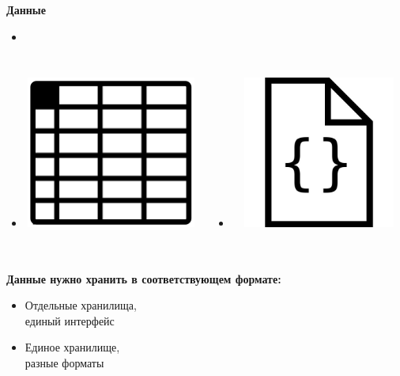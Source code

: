 \documentclass[18pt, compress, aspectratio=169]{beamer}
\begin{document}
\begin{frame}[fragile]
    \frametitle{}
    \begin{center}
        \textbf{Данные}
    \end{center}
    \begin{itemize}[leftmargin=*]
        \item <+->
    \end{itemize}

    \vspace{-40pt}

    \begin{columns}[T,onlytextwidth]
    \begin{itemize}[leftmargin=*]
        \item <+->\includegraphics[width=6cm,height=5cm]{relation.png}
    \end{itemize}

    \vspace{20pt}

    \begin{itemize}[leftmargin=*]
        \item <+->\includegraphics[width=6cm,height=5cm]{document.jpg}
    \end{itemize}
    \end{columns}
\end{frame}

\begin{frame}
    \frametitle{}
    \begin{center}
        \textbf{Данные нужно хранить в соответствующем формате:}
        \pause
        \begin{itemize}[label={\MVRightarrow}]
            \item <+-> Отдельные хранилища,\\ единый интерфейс
            \item <+-> Единое хранилище,\\ разные форматы
        \end{itemize}
    \end{center}
\end{frame}
\end{document}
